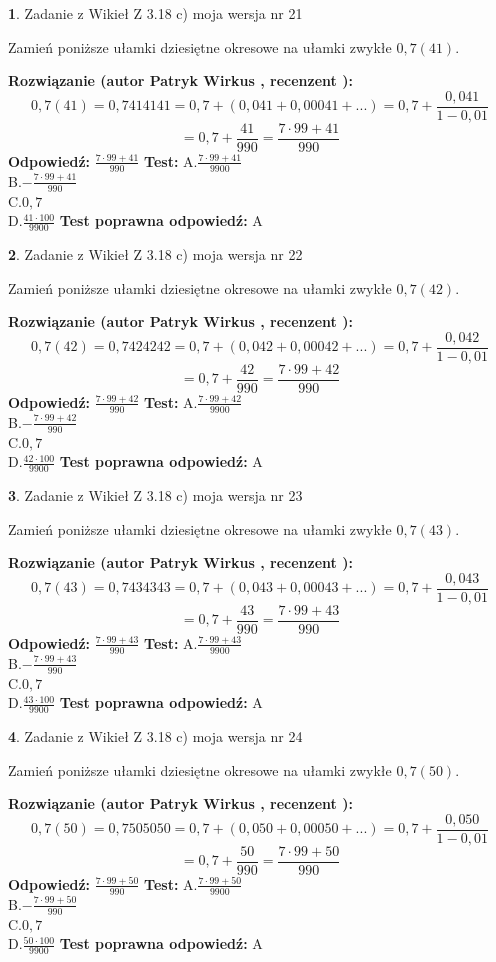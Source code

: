 \documentclass[12pt, a4paper]{article}
\theoremstyle{definition} %
\newtheorem{zad}{}
\newcommand{\zadStart}[1]{\begin{zad}#1\newline}
\newcommand{\zadStop}{\end{zad}}
\newcommand{\rozwStart}[2]{\noindent \textbf{Rozwiązanie (autor #1 , recenzent #2): }\newline}
\newcommand{\rozwStop}{\newline}
\newcommand{\odpStart}{\noindent \textbf{Odpowiedź:}\newline}
\newcommand{\odpStop}{\newline}
\newcommand{\testStart}{\noindent \textbf{Test:}\newline}
\newcommand{\testStop}{\newline}
\newcommand{\kluczStart}{\noindent \textbf{Test poprawna odpowiedź:}\newline}
\newcommand{\kluczStop}{\newline}
\begin{document}
\zadStart{Zadanie z Wikieł Z 3.18 c) moja wersja nr 21}

Zamień poniższe ułamki dziesiętne okresowe na ułamki zwykłe $0,7(41)$.
\zadStop
\rozwStart{Patryk Wirkus}{}
$$0,7(41)=0,7414141=0,7+(0,041+0,00041+...)=0,7+\frac{0,041}{1-0,01}$$
$$=0,7+\frac{41}{990}=\frac{7\cdot99+41}{990}$$
\rozwStop
\odpStart
$\frac{7\cdot99+41}{990}$
\odpStop
\testStart
A.$\frac{7\cdot99+41}{9900}$\\ B.$-\frac{7\cdot99+41}{990}$\\ C.$0,7$\\ D.$\frac{41\cdot100}{9900}$
\testStop
\kluczStart
A
\kluczStop



\zadStart{Zadanie z Wikieł Z 3.18 c) moja wersja nr 22}

Zamień poniższe ułamki dziesiętne okresowe na ułamki zwykłe $0,7(42)$.
\zadStop
\rozwStart{Patryk Wirkus}{}
$$0,7(42)=0,7424242=0,7+(0,042+0,00042+...)=0,7+\frac{0,042}{1-0,01}$$
$$=0,7+\frac{42}{990}=\frac{7\cdot99+42}{990}$$
\rozwStop
\odpStart
$\frac{7\cdot99+42}{990}$
\odpStop
\testStart
A.$\frac{7\cdot99+42}{9900}$\\ B.$-\frac{7\cdot99+42}{990}$\\ C.$0,7$\\ D.$\frac{42\cdot100}{9900}$
\testStop
\kluczStart
A
\kluczStop



\zadStart{Zadanie z Wikieł Z 3.18 c) moja wersja nr 23}

Zamień poniższe ułamki dziesiętne okresowe na ułamki zwykłe $0,7(43)$.
\zadStop
\rozwStart{Patryk Wirkus}{}
$$0,7(43)=0,7434343=0,7+(0,043+0,00043+...)=0,7+\frac{0,043}{1-0,01}$$
$$=0,7+\frac{43}{990}=\frac{7\cdot99+43}{990}$$
\rozwStop
\odpStart
$\frac{7\cdot99+43}{990}$
\odpStop
\testStart
A.$\frac{7\cdot99+43}{9900}$\\ B.$-\frac{7\cdot99+43}{990}$\\ C.$0,7$\\ D.$\frac{43\cdot100}{9900}$
\testStop
\kluczStart
A
\kluczStop



\zadStart{Zadanie z Wikieł Z 3.18 c) moja wersja nr 24}

Zamień poniższe ułamki dziesiętne okresowe na ułamki zwykłe $0,7(50)$.
\zadStop
\rozwStart{Patryk Wirkus}{}
$$0,7(50)=0,7505050=0,7+(0,050+0,00050+...)=0,7+\frac{0,050}{1-0,01}$$
$$=0,7+\frac{50}{990}=\frac{7\cdot99+50}{990}$$
\rozwStop
\odpStart
$\frac{7\cdot99+50}{990}$
\odpStop
\testStart
A.$\frac{7\cdot99+50}{9900}$\\ B.$-\frac{7\cdot99+50}{990}$\\ C.$0,7$\\ D.$\frac{50\cdot100}{9900}$
\testStop
\kluczStart
A
\kluczStop
\end{document}
